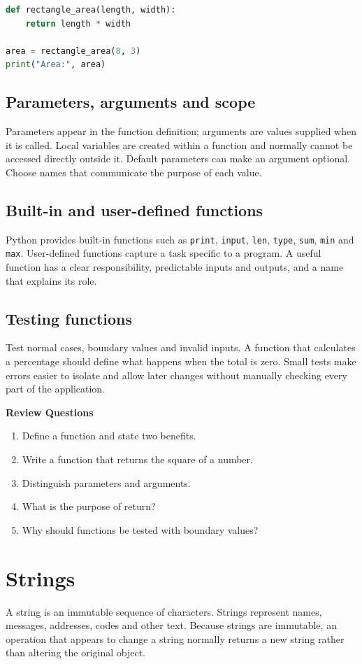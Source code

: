 \documentclass[11pt,openany,oneside]{book}
\newcommand{\reviewtitle}{\par\noindent\textbf{\color{Navy}Review Questions}\par}
\begin{document}
\begin{lstlisting}[style=webcode,language=Python]
def rectangle_area(length, width):
    return length * width

area = rectangle_area(8, 3)
print("Area:", area)
\end{lstlisting}

\section{Parameters, arguments and scope}
Parameters appear in the function definition; arguments are values supplied when it is called. Local variables are created within a function and normally cannot be accessed directly outside it. Default parameters can make an argument optional. Choose names that communicate the purpose of each value.

\section{Built-in and user-defined functions}
Python provides built-in functions such as \texttt{print}, \texttt{input}, \texttt{len}, \texttt{type}, \texttt{sum}, \texttt{min} and \texttt{max}. User-defined functions capture a task specific to a program. A useful function has a clear responsibility, predictable inputs and outputs, and a name that explains its role.

\section{Testing functions}
Test normal cases, boundary values and invalid inputs. A function that calculates a percentage should define what happens when the total is zero. Small tests make errors easier to isolate and allow later changes without manually checking every part of the application.

\reviewtitle
\begin{enumerate}
\item Define a function and state two benefits.
\item Write a function that returns the square of a number.
\item Distinguish parameters and arguments.
\item What is the purpose of return?
\item Why should functions be tested with boundary values?
\end{enumerate}

\chapter{Strings}
A string is an immutable sequence of characters. Strings represent names, messages, addresses, codes and other text. Because strings are immutable, an operation that appears to change a string normally returns a new string rather than altering the original object.
\end{document}
